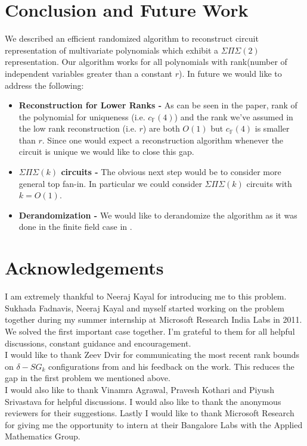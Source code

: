 \documentclass[letterpaper,USenglish,numberwithinsect]{lipics}
\newcommand{\F}{\mathbb{F}}
\begin{document}
\section{Conclusion and Future Work}
We described an efficient randomized algorithm to reconstruct circuit
representation of multivariate polynomials which exhibit a $\Sigma\Pi\Sigma(2)$
representation. Our algorithm works for all polynomials with rank(number of
independent variables greater than a constant $r$). In future we would like to
address the following:
\begin{itemize}
\item {\bf Reconstruction for Lower Ranks - } As can be seen in the paper, rank
of the polynomial for uniqueness (i.e. $c_{\F}(4)$) and the rank we've assumed
in the low rank reconstruction (i.e. $r$) are both $O(1)$ but $c_{\F}(4)$ is smaller than $r$. Since one would
expect a reconstruction
    algorithm whenever the circuit is unique we would like to close this gap.
    \item {\bf $\Sigma\Pi\Sigma(k)$ circuits - } The obvious next step would be to
consider more general top fan-in. In particular we could consider
$\Sigma\Pi\Sigma(k)$ circuits with $k=O(1)$.
        \item {\bf Derandomization - } We would like to derandomize the
algorithm as it was done in the finite field case in \cite{KarShp09}.
\end{itemize}


\section{Acknowledgements}
I am extremely thankful to Neeraj Kayal for introducing me to this problem.
Sukhada Fadnavis, Neeraj Kayal and myself started working on the problem
together during my summer internship at Microsoft Research India Labs in 2011.
We solved the first important case together. I'm grateful to them for all
helpful discussions, constant guidance and encouragement.\\

I would like to thank Zeev Dvir for communicating the most recent rank bounds
on $\delta-SG_k$ configurations from \cite{DSW12} and his feedback on the work.
This reduces the gap in the first problem we mentioned above. \\


I would also like to thank Vinamra Agrawal, Pravesh Kothari
and Piyush Srivastava for helpful discussions. I would also like to thank the anonymous reviewers
for their suggestions.
Lastly I would like to thank Microsoft Research for giving me the
opportunity to intern at their Bangalore Labs with the Applied Mathematics
Group.
\end{document}
